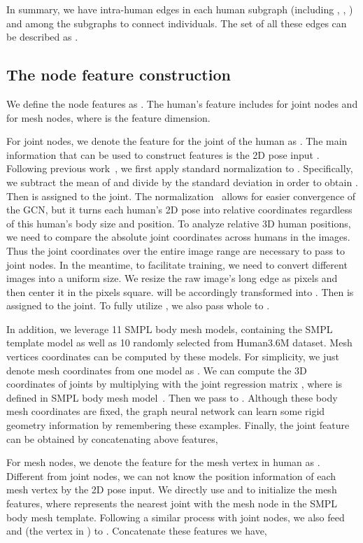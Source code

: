 \documentclass[runningheads]{llncs}
\begin{document}
In summary, we have intra-human edges in each human subgraph (including , , ) and  among the subgraphs to connect individuals. 
The set of all these edges can be described as  .

\subsection{The node feature construction}\label{subsection:feature}


We define the node features as . 
The  human's feature  includes  for joint nodes and  for mesh nodes, where  is the feature dimension. 

For joint nodes, we denote the feature for the  joint of the  human as . The main information that can be used to construct features is the 2D pose input . Following previous work~\cite{wandt2019repnet,choi2020pose2mesh}, we first apply standard normalization to . Specifically, we subtract the mean of  and divide by the standard deviation in order to obtain . Then  is assigned to the  joint. 
The normalization~\cite{wandt2019repnet} allows for easier convergence of the GCN, but it turns each human's 2D pose into relative coordinates regardless of this human's body size and position.
To analyze relative 3D human positions, we need to compare the absolute joint coordinates across humans in the images.
Thus the joint coordinates over the entire image range are necessary to pass to joint nodes.
In the meantime, to facilitate training, we need to convert different images into a uniform size.
We resize the raw image's long edge as  pixels and then center it in the  pixels square.
 will be accordingly transformed into . Then  is assigned to the  joint. To fully utilize , we also pass whole  to .

In addition, we leverage 11 SMPL body mesh models, containing the SMPL template model as well as 10 randomly selected from Human3.6M dataset. Mesh vertices coordinates can be computed by these models. For simplicity, we just denote mesh coordinates from one model as . We can compute the 3D coordinates of joints by multiplying  with the joint regression matrix , where  is defined in SMPL body mesh model~\cite{loper2015smpl}. Then we pass  to . Although these body mesh coordinates are fixed, the graph neural network can learn some rigid geometry information by remembering these examples. Finally, the joint feature can be obtained by concatenating above features,


For mesh nodes, we denote the feature for the  mesh vertex in  human as . Different from joint nodes, we can not know the  position information of each mesh vertex by the 2D pose input. We directly use  and  to initialize the mesh features, where  represents the nearest joint with the  mesh node in the SMPL body mesh template. Following a similar process with joint nodes, we also feed  and  (the  vertex in ) to . Concatenate these features we have,
\end{document}
